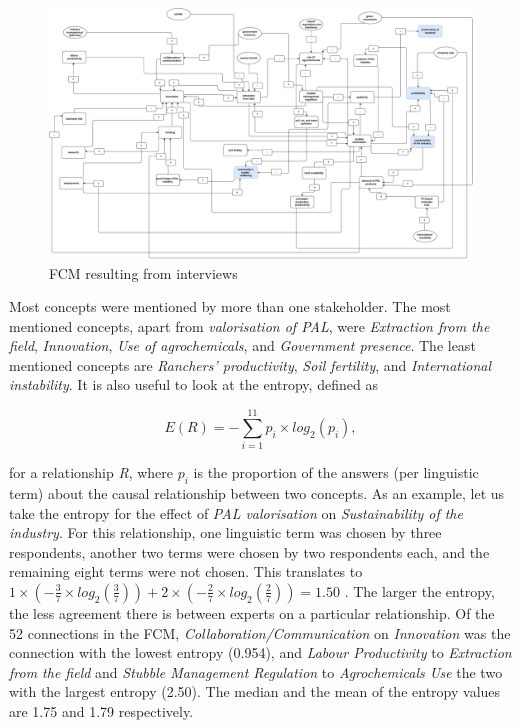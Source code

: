 \newpage

\begin{landscape}
\begin{figure}[H]
\caption{FCM resulting from interviews}  
\label{FCMdiagram}
\centering
\includegraphics[width=23 cm]{fig/diagram.drawio.pdf}
\end{figure}
\end{landscape}

\clearpage

Most concepts were mentioned by more than one stakeholder. The most mentioned concepts, apart from \textit{valorisation of PAL}, were \textit{Extraction from the field}, \textit{Innovation}, \textit{Use of agrochemicals}, and \textit{Government presence}. The least mentioned concepts are \textit{Ranchers' productivity}, \textit{Soil fertility}, and \textit{International instability}. It is also useful to look at the entropy, defined as 

\begin{equation}
\label{entropyEq}
E(R) = - \sum_{i=1}^{11} p_i \times log_2(p_i),   
\end{equation}

for a relationship \textit{R}, where $p_i$ is the proportion of the answers (per linguistic term) about the causal relationship between two concepts. As an example, let us take the entropy for the effect of \textit{PAL valorisation} on \textit{Sustainability of the industry}. For this relationship, one linguistic term was chosen by three respondents, another two terms were chosen by two respondents each, and the remaining eight terms were not chosen. This translates to $1 \times (- \frac{3}{7} \times log_2(\frac{3}{7})) + 2 \times (- \frac{2}{7} \times log_2(\frac{2}{7})) = 1.50 $ . The larger the entropy, the less agreement there is between experts on a particular relationship. Of the 52 connections in the FCM,  \textit{Collaboration/Communication} on \textit{Innovation} was the connection with the lowest entropy (0.954), and \textit{Labour Productivity} to \textit{Extraction from the field} and \textit{Stubble Management Regulation} to \textit{Agrochemicals Use} the two with the largest entropy (2.50). The median and the mean of the entropy values are 1.75 and 1.79 respectively. 

